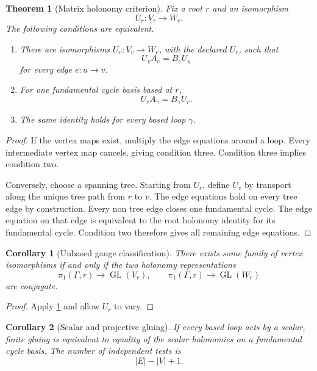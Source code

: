 \documentclass[11pt]{amsart}
\newtheorem{theorem}{Theorem}[section]
\newtheorem{corollary}[corollary]{Corollary}
\theoremstyle{definition}
\theoremstyle{remark}
\newcommand{\GL}{\operatorname{GL}}
\newcommand{\abs}[1]{\left\lvert#1\right\rvert}
\begin{document}
\begin{theorem}[Matrix holonomy criterion]\label{thm:matrix_holonomy}
Fix a root \(r\) and an isomorphism
\[
U_r:V_r\longrightarrow W_r.
\]
The following conditions are equivalent.

\begin{enumerate}
\item There are isomorphisms \(U_v:V_v\to W_v\), with the declared \(U_r\), such that
\[
U_vA_e=B_eU_u
\]
for every edge \(e:u\to v\).
\item For one fundamental cycle basis based at \(r\),
\[
U_rA_\gamma=B_\gamma U_r.
\]
\item The same identity holds for every based loop \(\gamma\).
\end{enumerate}
\end{theorem}

\begin{proof}
If the vertex maps exist, multiply the edge equations around a loop. Every intermediate vertex map cancels, giving condition three. Condition three implies condition two.

Conversely, choose a spanning tree. Starting from \(U_r\), define \(U_v\) by transport along the unique tree path from \(r\) to \(v\). The edge equations hold on every tree edge by construction. Every non tree edge closes one fundamental cycle. The edge equation on that edge is equivalent to the root holonomy identity for its fundamental cycle. Condition two therefore gives all remaining edge equations.
\end{proof}

\begin{corollary}[Unbased gauge classification]\label{cor:unbased_holonomy}
There exists some family of vertex isomorphisms if and only if the two holonomy representations
\[
\pi_1(\Gamma,r)\longrightarrow\GL(V_r),
\qquad
\pi_1(\Gamma,r)\longrightarrow\GL(W_r)
\]
are conjugate.
\end{corollary}

\begin{proof}
Apply \cref{thm:matrix_holonomy} and allow \(U_r\) to vary.
\end{proof}

\begin{corollary}[Scalar and projective gluing]\label{cor:scalar_holonomy}
If every based loop acts by a scalar, finite gluing is equivalent to equality of the scalar holonomies on a fundamental cycle basis. The number of independent tests is
\[
\boxed{
\abs E-\abs V+1.
}
\]
\end{corollary}
\end{document}
